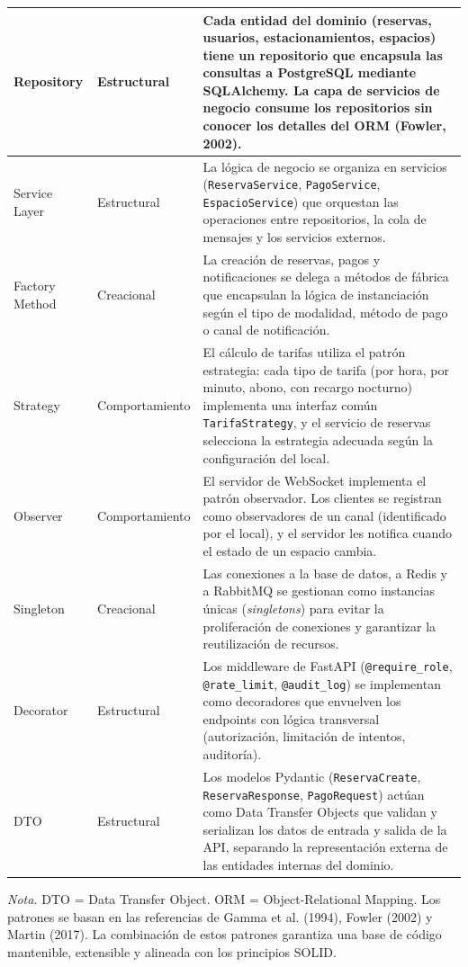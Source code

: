 \begin{longtable}{p{2.5cm} p{2.5cm} p{9cm}}
Repository & Estructural & Cada entidad del dominio (reservas, usuarios, estacionamientos, espacios) tiene un repositorio que encapsula las consultas a PostgreSQL mediante SQLAlchemy. La capa de servicios de negocio consume los repositorios sin conocer los detalles del ORM (Fowler, 2002). \\
\midrule
Service Layer & Estructural & La lógica de negocio se organiza en servicios (\texttt{ReservaService}, \texttt{PagoService}, \texttt{EspacioService}) que orquestan las operaciones entre repositorios, la cola de mensajes y los servicios externos. \\
\midrule
Factory Method & Creacional & La creación de reservas, pagos y notificaciones se delega a métodos de fábrica que encapsulan la lógica de instanciación según el tipo de modalidad, método de pago o canal de notificación. \\
\midrule
Strategy & Comportamiento & El cálculo de tarifas utiliza el patrón estrategia: cada tipo de tarifa (por hora, por minuto, abono, con recargo nocturno) implementa una interfaz común \texttt{TarifaStrategy}, y el servicio de reservas selecciona la estrategia adecuada según la configuración del local. \\
\midrule
Observer & Comportamiento & El servidor de WebSocket implementa el patrón observador. Los clientes se registran como observadores de un canal (identificado por el local), y el servidor les notifica cuando el estado de un espacio cambia. \\
\midrule
Singleton & Creacional & Las conexiones a la base de datos, a Redis y a RabbitMQ se gestionan como instancias únicas (\textit{singletons}) para evitar la proliferación de conexiones y garantizar la reutilización de recursos. \\
\midrule
Decorator & Estructural & Los middleware de FastAPI (\texttt{@require\_role}, \texttt{@rate\_limit}, \texttt{@audit\_log}) se implementan como decoradores que envuelven los endpoints con lógica transversal (autorización, limitación de intentos, auditoría). \\
\midrule
DTO & Estructural & Los modelos Pydantic (\texttt{ReservaCreate}, \texttt{ReservaResponse}, \texttt{PagoRequest}) actúan como Data Transfer Objects que validan y serializan los datos de entrada y salida de la API, separando la representación externa de las entidades internas del dominio. \\
\end{longtable}

\textit{Nota.} DTO = Data Transfer Object. ORM = Object-Relational Mapping. Los patrones se basan en las referencias de Gamma et al. (1994), Fowler (2002) y Martin (2017). La combinación de estos patrones garantiza una base de código mantenible, extensible y alineada con los principios SOLID.
